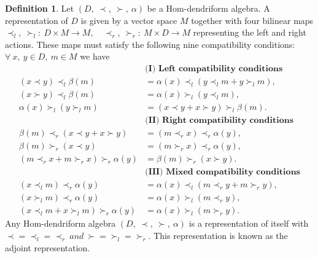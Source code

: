 \documentclass[11pt,twoside,reqno]{amsart}
\theoremstyle{plain}
\theoremstyle{definition}
\newtheorem{definition}[thm]{Definition}
\begin{document}
\begin{definition}\label{d5}
Let $(D,\  \prec,\  \succ,\  \alpha)$ be a Hom-dendriform algebra. A representation of $ D$ is given
 by a vector space $M$ together with four bilinear maps
$\prec_l ,\ \succ_l :\ D \times M \to M  ,\quad
\prec_r ,\ \succ_r :\ M \times D \to M  $
    representing the left and right actions. These maps must satisfy the following nine compatibility conditions: $\forall \ x,\ y \in D   ,\ m \in M $ we have
\begin{align*}
&\textbf{(I) Left compatibility conditions} \\
(x \prec y) \prec_l \beta(m) &= \alpha(x) \prec_l (y \prec_l m + y \succ_l m), \\
(x \succ y) \prec_l \beta(m) &= \alpha(x) \succ_l (y \prec_l m), \\
\alpha(x) \succ_l (y \succ_l m) &= (x \prec y + x \succ y) \succ_l \beta(m). \\
&\textbf{(II) Right compatibility conditions} \\
\beta(m) \prec_r (x \prec y + x \succ y) &= (m \prec_r x) \prec_r \alpha(y), \\
\beta(m) \succ_r (x \prec y) &= (m \succ_r x) \prec_r \alpha(y), \\
(m \prec_r x + m \succ_r x) \succ_r \alpha(y) &= \beta(m) \succ_r (x \succ y).\\
&\textbf{(III) Mixed compatibility conditions} \\
(x \prec_l m) \prec_r \alpha(y) &= \alpha(x) \prec_l (m \prec_r y + m \succ_r y), \\
(x \succ_l m) \prec_r \alpha(y) &= \alpha(x) \succ_l (m \prec_r y), \\
(x \prec_l m + x \succ_l m) \succ_r \alpha(y) &= \alpha(x) \succ_l (m \succ_r y).
\end{align*}
Any Hom-dendriform algebra $(D,\  \prec,\  \succ,\  \alpha)$ is a representation of itself with
$\prec=\prec_{l}=\prec_r \ and \  \succ=\succ_l=\succ_r.$
 This representation is known as the adjoint representation.
\end{definition}
\end{document}

